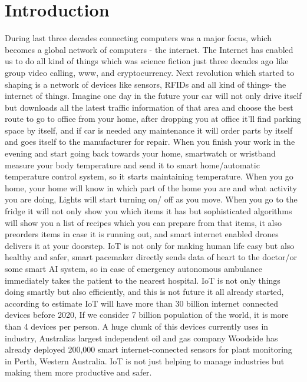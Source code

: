 \documentclass[preprint,10pt,5p]{elsarticle}
\begin{document}
\section{Introduction}
During last three decades connecting computers was a major focus, which becomes a global network of computers - the internet. The Internet has enabled us to do all kind of things which was science fiction just three decades ago like group video calling, www, and cryptocurrency. 
Next revolution which started to shaping is a network of devices like sensors,  RFIDs and all kind of things- the internet of things. 
Imagine one day in the future your car will not only drive itself but downloads all the latest traffic information of that area and choose the best route to go to office from your home, after dropping you at office it'll find parking space by itself, and if car is needed any maintenance it will order parts by itself and goes itself to the manufacturer for repair.\cite{gerla2014internet} When you finish your work in the evening and start going back towards your home, smartwatch or wristband measure your body temperature and send it to smart home/automatic temperature control system, so it starts maintaining temperature. When you go home, your home will know in which part of the home you are and what activity you are doing, Lights will start turning on/ off as you move.\cite{han2010smart} When you go to the fridge it will not only show you which items it has but sophisticated algorithms will show you a list of recipes which you can prepare from that items, it also preorders items in case it is running out, and smart internet enabled drones delivers it at your doorstep.\cite{helal2005gator}\cite{zhou2014unmanned} IoT is not only for making human life easy but also healthy and safer, smart pacemaker directly sends data of heart to the doctor/or some smart AI system, so in case of emergency autonomous ambulance immediately takes the patient to the nearest hospital. IoT is not only things doing smartly but also efficiently, and this is not future it all already started, according to estimate IoT will have more than 30 billion internet connected devices before 2020, If we consider 7 billion population of the world, it is more than 4 devices per person.\cite{atzori2010internet} A huge chunk of this devices currently uses in industry, Australias largest independent oil and gas company Woodside has already deployed 200,000 smart internet-connected sensors for plant monitoring in Perth, Western Australia. IoT is not just helping to manage industries but making them more productive and safer.\cite{Bloede2015}
\end{document}

